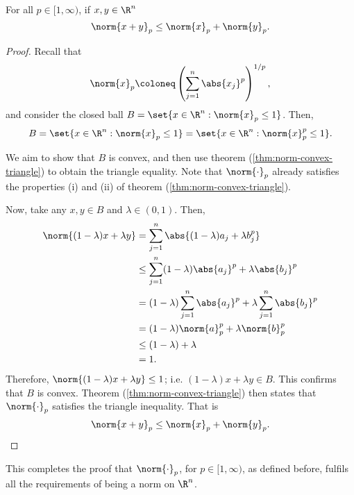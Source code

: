 \documentclass[draft]{penrose}
\begin{document}
\begin{ncor}
  For all $p \in [1,\infty)$, if $x, y \in \R^n$
  \begin{equation*}
    \norm{x+y}_{p} \leq \norm{x}_{p} + \norm{y}_{p}.
  \end{equation*}
\end{ncor}
\begin{proof}
  Recall that
  \begin{equation*}
    \norm{x}_{p} \coloneq \left(\sum_{j=1}^{n} \abs{x_j}^{p}\right)^{1/p},
  \end{equation*}
  and consider the closed ball $B = \set{x \in \R^n : \norm{x}_p \leq 1}$. Then,
  \begin{equation*}
    B = \set{x \in \R^n : \norm{x}_p \leq 1} = \set{x \in \R^n : \norm{x}_{p}^{p} \leq 1}.
  \end{equation*}

  We aim to show that $B$ is convex, and then use theorem (\ref{thm:norm-convex-triangle}) to obtain the triangle equality. Note that $\norm{\cdot}_{p}$ already satisfies the properties (i) and (ii) of theorem (\ref{thm:norm-convex-triangle}).

  Now, take any $x,y \in B$ and $\lambda \in (0,1)$. Then,
  \begin{align*}
  \norm{(1-\lambda) x + \lambda y}
  &= \sum_{j=1}^{n} \abs{(1-\lambda) a_j + \lambda b_j^{p}}\\
  &\leq \sum_{j=1}^{n} (1-\lambda) \abs{a_j}^{p} + \lambda \abs{b_j}^{p}\\
  &= (1-\lambda)\sum_{j=1}^{n} \abs{a_j}^{p} + \lambda \sum_{j=1}^{n} \abs{b_j}^{p} \\
  &= (1-\lambda)\norm{a}_{p}^{p}+\lambda\norm{b}_{p}^{p}\\
  &\leq (1-\lambda)+\lambda\\
  &= 1.
  \end{align*}
  Therefore, $\norm{(1-\lambda) x + \lambda y} \leq 1$; i.e. $(1-\lambda) x + \lambda y \in B$. This confirms that $B$ is convex. Theorem (\ref{thm:norm-convex-triangle}) then states that $\norm{\cdot}_{p}$ satisfies the triangle inequality. That is
  \begin{equation*}
  \norm{x+y}_{p} \leq \norm{x}_{p} + \norm{y}_{p}.\qedhere
  \end{equation*}
\end{proof}

\begin{remark}
  This completes the proof that $\norm{\cdot}_{p}$, for $p \in [1,\infty)$, as defined before, fulfils all the requirements of being a norm on $\R^n$.
\end{remark}
\end{document}

